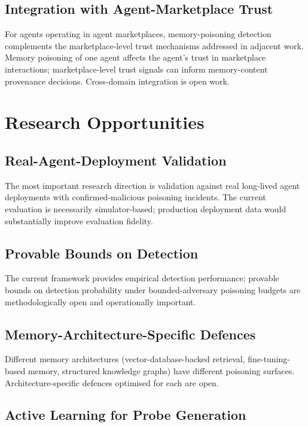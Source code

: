 \documentclass[sigconf,nonacm]{acmart}
\begin{document}
\subsection{Integration with Agent-Marketplace Trust}

For agents operating in agent marketplaces, memory-poisoning
detection complements the marketplace-level trust mechanisms
addressed in adjacent work. Memory poisoning of one agent affects
the agent's trust in marketplace interactions; marketplace-level
trust signals can inform memory-content provenance decisions.
Cross-domain integration is open work.

\section{Research Opportunities}

\subsection{Real-Agent-Deployment Validation}

The most important research direction is validation against
real long-lived agent deployments with confirmed-malicious
poisoning incidents. The current evaluation is necessarily
simulator-based; production deployment data would substantially
improve evaluation fidelity.

\subsection{Provable Bounds on Detection}

The current framework provides empirical detection performance;
provable bounds on detection probability under bounded-adversary
poisoning budgets are methodologically open and operationally
important.

\subsection{Memory-Architecture-Specific Defences}

Different memory architectures (vector-database-backed retrieval,
fine-tuning-based memory, structured knowledge graphs) have
different poisoning surfaces. Architecture-specific defences
optimised for each are open.

\subsection{Active Learning for Probe Generation}
\end{document}

